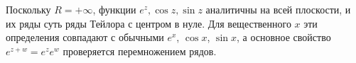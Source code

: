 \begin{Remark}{}{}
	Поскольку $R = +\infty$, функции $e^z, \cos z, \sin z$ аналитичны на всей плоскости, и их ряды суть ряды Тейлора с центром в нуле. Для вещественного $x$ эти определения совпадают с обычными $e^x$, $\cos x$, $\sin x$, а основное свойство $e^{z+w} = e^z e^w$ проверяется перемножением рядов.
\end{Remark}
